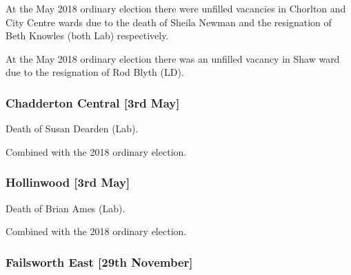 \begin{resultsiii}

At the May 2018 ordinary election there were unfilled vacancies in Chorlton and City Centre wards due to the death of Sheila Newman and the resignation of Beth Knowles (both Lab) respectively.


At the May 2018 ordinary election there was an unfilled vacancy in Shaw ward due to the resignation of Rod Blyth (LD).

\subsubsection*{Chadderton Central \hspace*{\fill}\nolinebreak[1]%
\enspace\hspace*{\fill}
[3rd May]}


Death of Susan Dearden (Lab).

Combined with the 2018 ordinary election.

\subsubsection*{Hollinwood \hspace*{\fill}\nolinebreak[1]%
\enspace\hspace*{\fill}
[3rd May]}


Death of Brian Ames (Lab).

Combined with the 2018 ordinary election.

\subsubsection*{Failsworth East \hspace*{\fill}\nolinebreak[1]%
	\enspace\hspace*{\fill}
	[29th November]}



\end{resultsiii}
